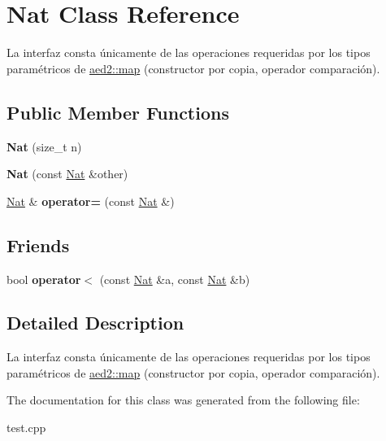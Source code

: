 \hypertarget{classNat}{\section{\-Nat \-Class \-Reference}
\label{classNat}
}


\-La interfaz consta únicamente de las operaciones requeridas por los tipos paramétricos de \hyperlink{classaed2_1_1map}{aed2\-::map} (constructor por copia, operador comparación).  


\subsection*{\-Public \-Member \-Functions}
\begin{DoxyCompactItemize}
\item 
\hypertarget{classNat_a1b219ae0b51869d25832d6c21a19695b}{{\bfseries \-Nat} (size\-\_\-t n)}\label{classNat_a1b219ae0b51869d25832d6c21a19695b}

\item 
\hypertarget{classNat_aa7e51302b022e4639be8dbe12082b8d8}{{\bfseries \-Nat} (const \hyperlink{classNat}{\-Nat} \&other)}\label{classNat_aa7e51302b022e4639be8dbe12082b8d8}

\item 
\hypertarget{classNat_a71b73b7cd40b1b2ac5d3de8cf16f6c79}{\hyperlink{classNat}{\-Nat} \& {\bfseries operator=} (const \hyperlink{classNat}{\-Nat} \&)}\label{classNat_a71b73b7cd40b1b2ac5d3de8cf16f6c79}

\end{DoxyCompactItemize}
\subsection*{\-Friends}
\begin{DoxyCompactItemize}
\item 
\hypertarget{classNat_a2d91ef10d349e4dcc3b67c77a1eb9755}{bool {\bfseries operator$<$} (const \hyperlink{classNat}{\-Nat} \&a, const \hyperlink{classNat}{\-Nat} \&b)}\label{classNat_a2d91ef10d349e4dcc3b67c77a1eb9755}

\end{DoxyCompactItemize}


\subsection{\-Detailed \-Description}
\-La interfaz consta únicamente de las operaciones requeridas por los tipos paramétricos de \hyperlink{classaed2_1_1map}{aed2\-::map} (constructor por copia, operador comparación). 

\-The documentation for this class was generated from the following file\-:\begin{DoxyCompactItemize}
\item 
test.\-cpp\end{DoxyCompactItemize}
